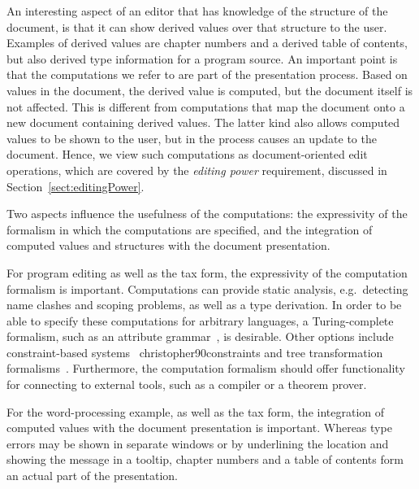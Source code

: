 \documentclass{speauth}
\begin{document}
An interesting aspect of an editor that has knowledge of the structure of the document, is that it can show derived values over that structure to the user. Examples of derived values are chapter numbers and a derived table of contents, but also derived type information for a program source. An important point is that the computations we refer to are part of the presentation process. Based on values in the document, the derived value is computed, but the document itself is not affected. This is different from computations that map the document onto a new document containing derived values. The latter kind also allows computed values to be shown to the user, but in the process causes an update to the document. Hence, we view such computations as document-oriented edit operations, which are covered by the {\em editing power} requirement, discussed in Section~\ref{sect:editingPower}.


Two aspects influence the usefulness of the computations: the expressivity of the formalism in which the computations are specified, and the integration of computed values and structures with the document presentation. 


For program editing as well as the tax form, the expressivity of the computation formalism is important. Computations can provide static analysis, e.g.\ detecting name clashes and scoping problems, as well as a type derivation. In order to be able to specify these computations for arbitrary languages, a Turing-complete formalism, such as an attribute grammar~\cite{swierstra04ag}, is desirable. Other options include constraint-based systems~\cite{ganzevoort92views,myers90garnet,borning81thinglab,ballance92pan} \bc christopher90constraints \ec and tree transformation formalisms~\cite{visser01stratego,xslt10}. Furthermore, the computation formalism should offer functionality for connecting to external tools, such as a compiler or a theorem prover.

For the word-processing example, as well as the tax form, the integration of computed values with the document presentation is important. Whereas type errors may be shown in separate windows or by underlining the location and showing the message in a tooltip, chapter numbers and a table of contents form an actual part of the presentation. 



%																
\end{document}
